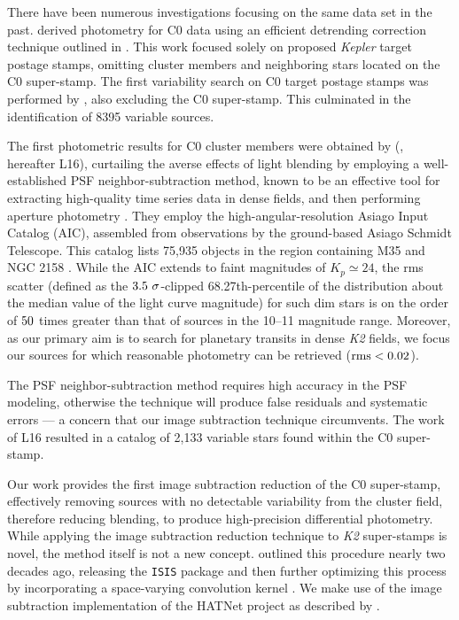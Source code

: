 \documentclass[apjl]{emulateapj}
\begin{document}
There have been numerous investigations focusing on the same data set in
the past.  \citet{Vanderburg:2014} derived photometry for C0 data using
an efficient detrending correction technique outlined in
\citet{vanderburg_johnson:2014}.  This work focused solely on proposed
\textit{Kepler} target postage stamps, omitting cluster members and
neighboring stars located on the C0 super-stamp.  The first variability
search on C0 target postage stamps was performed by
\citet{Armstrong:2015}, also excluding the C0 super-stamp.  This
culminated in the identification of 8395 variable sources.

The first photometric results for C0 cluster members were obtained by
(\citet{Libralato:2016a}, hereafter L16), curtailing the averse effects of
light blending by employing a well-established PSF neighbor-subtraction
method, known to be an effective tool for extracting high-quality time
series data in dense fields, and then performing aperture photometry
\citep{Montalto:2007}.  They employ the high-angular-resolution Asiago
Input Catalog (AIC), assembled from observations by the ground-based
Asiago Schmidt Telescope.  This catalog lists 75,935 objects in the
region containing M35 and NGC 2158 \citep{Nardiello:2015}.  While the
AIC extends to faint magnitudes of $K_{p}\simeq24$, the rms scatter
(defined as the $3.5 \rm \ \sigma$-clipped 68.27th-percentile of the
distribution about the median value of the light curve magnitude) for
such dim stars is on the order of $\rm 50$ times greater than that of
sources in the 10--11 magnitude range. Moreover, as our primary aim is
to search for planetary transits in dense \textit{K2} fields, we focus
our sources for which reasonable photometry can be retrieved ($\rm rms <
0.02$).

The PSF neighbor-subtraction method requires high accuracy in the PSF
modeling, otherwise the technique will produce false residuals and
systematic errors --- a concern that our image subtraction technique
circumvents. The work of L16 resulted in a catalog
of 2,133 variable stars found within the C0 super-stamp.

Our work provides the first image subtraction reduction of the
C0 super-stamp, effectively removing sources with no detectable
variability from the cluster field, therefore reducing blending, to
produce high-precision differential photometry.  While applying the
image subtraction reduction technique to \textit{K2} super-stamps is
novel, the method itself is not a new concept.  \citet{Alard:1998}
outlined this procedure nearly two decades ago, releasing the
\texttt{ISIS} package and then further optimizing this process by
incorporating a space-varying convolution kernel \citep{Alard:2000}.  We
make use of the image subtraction implementation of the HATNet project
\citep{Bakos:2010} as described by \citet{Pal:2012}.
\end{document}
